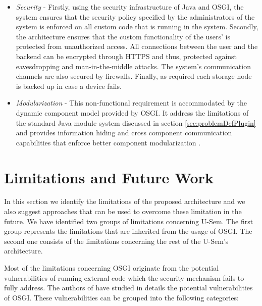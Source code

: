 \begin{itemize}
\item \textit{Security} - Firstly, using the security infrastructure of Java and OSGI, the system ensures that the security policy specified by the administrators of the system is enforced on all custom code that is running in the system. Secondly, the architecture ensures that the custom functionality of the users' is protected from unauthorized access. All connections between the user and the backend can be encrypted through HTTPS and thus, protected against eavesdropping and man-in-the-middle attacks. The system's communication channels are also secured by firewalls. Finally, as required each storage node is backed up in case a device fails.

\item \textit{Modularization} - This non-functional requirement is accommodated by the dynamic component model provided by OSGI. It address the limitations of the standard Java module system discussed in section \ref{sec:problemDefPlugin} and provides information hiding and cross component communication capabilities that enforce better component modularization \cite{Andre}.

\end{itemize}


\section{Limitations and Future Work}
\label{sec:limitsPlugin}

In this section we identify the limitations of the proposed architecture and we also suggest approaches that can be used to overcome these limitation in the future. We have identified two groups of limitations concerning U-Sem. The first group represents the limitations that are inherited from the usage of OSGI. The second one consists of the limitations concerning the rest of the U-Sem's architecture.

Most of the limitations concerning OSGI originate from the potential vulnerabilities of running external code which the security mechanism fails to fully address. The authors of \cite{Parrend} have studied in details the potential vulnerabilities of OSGI. These vulnerabilities can be grouped into the following categories:

